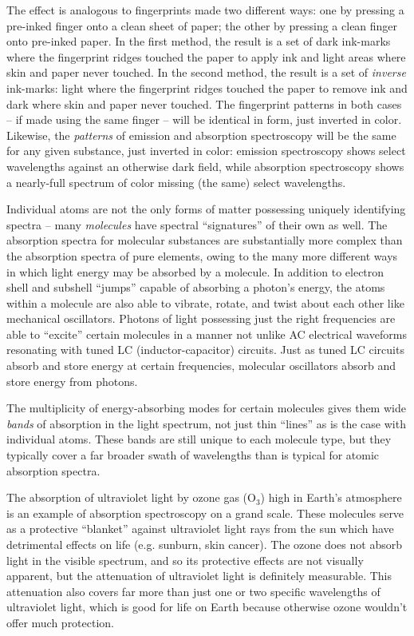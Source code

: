 The effect is analogous to fingerprints made two different ways: one by pressing a pre-inked finger onto a clean sheet of paper; the other by pressing a clean finger onto pre-inked paper.  In the first method, the result is a set of dark ink-marks where the fingerprint ridges touched the paper to apply ink and light areas where skin and paper never touched.  In the second method, the result is a set of \textit{inverse} ink-marks: light where the fingerprint ridges touched the paper to remove ink and dark where skin and paper never touched.  The fingerprint patterns in both cases -- if made using the same finger -- will be identical in form, just inverted in color.  Likewise, the \textit{patterns} of emission and absorption spectroscopy will be the same for any given substance, just inverted in color: emission spectroscopy shows select wavelengths against an otherwise dark field, while absorption spectroscopy shows a nearly-full spectrum of color missing (the same) select wavelengths. 

\vskip 10pt

Individual atoms are not the only forms of matter possessing uniquely identifying spectra -- many \textit{molecules} have spectral ``signatures'' of their own as well.  The absorption spectra for molecular substances are substantially more complex than the absorption spectra of pure elements, owing to the many more different ways in which light energy may be absorbed by a molecule.  In addition to electron shell and subshell ``jumps'' capable of absorbing a photon's energy, the atoms within a molecule are also able to vibrate, rotate, and twist about each other like mechanical oscillators.  Photons of light possessing just the right frequencies are able to ``excite'' certain molecules in a manner not unlike AC electrical waveforms resonating with tuned LC (inductor-capacitor) circuits.  Just as tuned LC circuits absorb and store energy at certain frequencies, molecular oscillators absorb and store energy from photons.

The multiplicity of energy-absorbing modes for certain molecules gives them wide \textit{bands} of absorption in the light spectrum, not just thin ``lines'' as is the case with individual atoms.  These bands are still unique to each molecule type, but they typically cover a far broader swath of wavelengths than is typical for atomic absorption spectra.

The absorption of ultraviolet light by ozone gas (O$_{3}$) high in Earth's atmosphere is an example of absorption spectroscopy on a grand scale.  These molecules serve as a protective ``blanket'' against ultraviolet light rays from the sun which have detrimental effects on life (e.g. sunburn, skin cancer).  The ozone does not absorb light in the visible spectrum, and so its protective effects are not visually apparent, but the attenuation of ultraviolet light is definitely measurable.  This attenuation also covers far more than just one or two specific wavelengths of ultraviolet light, which is good for life on Earth because otherwise ozone wouldn't offer much protection.

